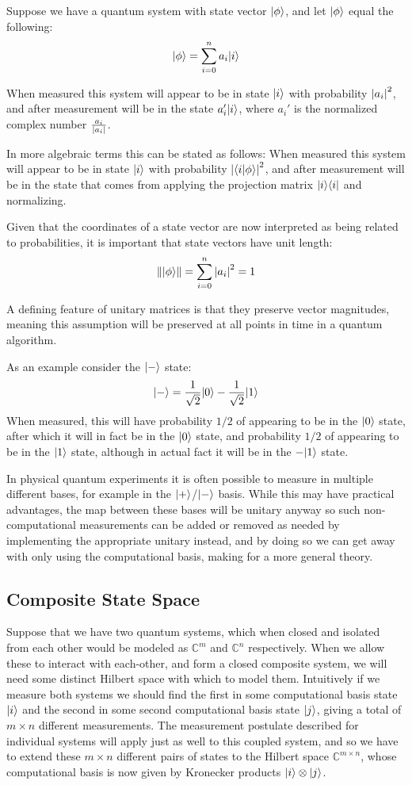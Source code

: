 Suppose we have a quantum system with state vector $| \phi \rangle$, and let $| \phi \rangle$ equal the following:
\[| \phi \rangle = \sum_{i=0}^n a_i| i \rangle\]

When measured this system will appear to be in state $| i \rangle$ with probability $\left| a_i \right|^2$, and after measurement will be in the state $a_i'| i \rangle$, where $a_i'$ is the normalized complex number $\frac{a_i}{\left| a_i \right|}$.

In more algebraic terms this can be stated as follows:
When measured this system will appear to be in state $| i \rangle$ with probability $\left| \langle i | \phi \rangle \right|^2$, and after measurement will be in the state that comes from applying the projection matrix $| i \rangle\langle i |$ and normalizing.

Given that the coordinates of a state vector are now interpreted as being related to probabilities, it is important that state vectors have unit length:
\[\left\Vert | \phi \rangle \right\Vert = \sum_{i=0}^n \left| a_i \right|^2 = 1\]

A defining feature of unitary matrices is that they preserve vector magnitudes, meaning this assumption will be preserved at all points in time in a quantum algorithm.

As an example consider the $| - \rangle$ state:
\[| - \rangle=\frac{1}{\sqrt{2}}| 0 \rangle - \frac{1}{\sqrt{2}}| 1 \rangle\]
When measured, this will have probability $1/2$ of appearing to be in the $| 0 \rangle$ state, after which it will in fact be in the $| 0 \rangle$ state, and probability $1/2$ of appearing to be in the $| 1 \rangle$ state, although in actual fact it will be in the $-| 1 \rangle$ state.

In physical quantum experiments it is often possible to measure in multiple different bases, for example in the $| + \rangle$/$| - \rangle$ basis. While this may have practical advantages, the map between these bases will be unitary anyway so such non-computational measurements can be added or removed as needed by implementing the appropriate unitary instead, and by doing so we can get away with only using the computational basis, making for a more general theory.
\subsection{Composite State Space}
Suppose that we have two quantum systems, which when closed and isolated from each other would be modeled as $\mathbb{C}^m$ and $\mathbb{C}^n$ respectively. When we allow these to interact with each-other, and form a closed composite system, we will need some distinct Hilbert space with which to model them. Intuitively if we measure both systems we should find the first in some computational basis state $| i \rangle$ and the second in some second computational basis state $| j \rangle$, giving a total of $m \times n$ different measurements. The measurement postulate described for individual systems will apply just as well to this coupled system, and so we have to extend these $m \times n$ different pairs of states to the Hilbert space $\mathbb{C}^{m \times n}$, whose computational basis is now given by Kronecker products $| i \rangle \otimes | j \rangle$.

